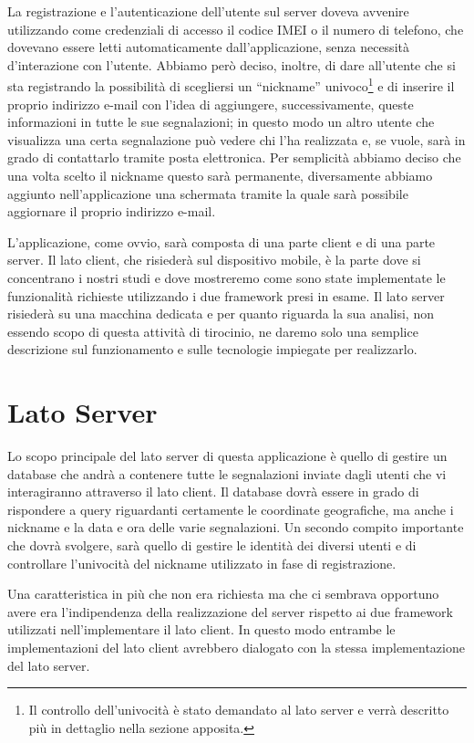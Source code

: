 	La registrazione e l'autenticazione dell'utente sul server doveva avvenire 
	utilizzando come credenziali di accesso il codice IMEI o il numero di
	telefono, che dovevano essere letti automaticamente dall'applicazione,
	senza necessità d'interazione con l'utente. Abbiamo però deciso, inoltre, di
	dare all'utente che si sta registrando la possibilità di scegliersi un
	``nickname'' univoco\footnote{Il controllo dell'univocità è stato demandato
	al lato server e verrà descritto più in dettaglio nella sezione apposita.}
	e di inserire il proprio indirizzo e-mail con l'idea di aggiungere,
	successivamente, queste informazioni in tutte le sue segnalazioni; in questo
	modo un altro utente che visualizza una certa segnalazione può vedere chi
	l'ha realizzata e, se vuole, sarà in grado di contattarlo tramite posta
	elettronica. Per semplicità abbiamo deciso che una volta scelto il nickname
	questo sarà permanente, diversamente abbiamo aggiunto nell'applicazione una
	schermata tramite la quale sarà possibile aggiornare il proprio indirizzo
	e-mail.
	
	L'applicazione, come ovvio, sarà composta di una parte client e di una parte
	server. Il lato client, che risiederà sul dispositivo mobile, è la parte dove
	si concentrano i nostri studi e dove
	mostreremo come sono state implementate le funzionalità richieste
	utilizzando i due frame\-work presi in esame. Il lato server risiederà
	su una macchina dedicata e per quanto riguarda la sua analisi, non
	essendo scopo di questa attività di tirocinio, ne daremo solo una
	semplice descrizione sul funzionamento e sulle tecnologie
	impiegate per realizzarlo.
	
	\section{Lato Server}
		Lo scopo principale del lato server di questa applicazione è quello di
		gestire un database che andrà a contenere tutte le segnalazioni inviate
		dagli utenti che vi interagiranno attraverso il lato client. Il
		database dovrà essere in grado di rispondere a query riguardanti
		certamente le coordinate geografiche, ma anche i nickname e la data e
		ora delle varie segnalazioni. Un secondo compito importante che dovrà
		svolgere, sarà quello di gestire le identità dei diversi utenti e di
		controllare l'univocità del nickname utilizzato in fase di
		registrazione.
		
		Una caratteristica in più che non era richiesta ma che ci sembrava
		opportuno avere era l'indipendenza della realizzazione del server
		rispetto ai due frame\-work utilizzati nell'implementare il lato client.
		In questo modo entrambe le implementazioni del lato client avrebbero
		dialogato con la stessa implementazione del lato server.
		
